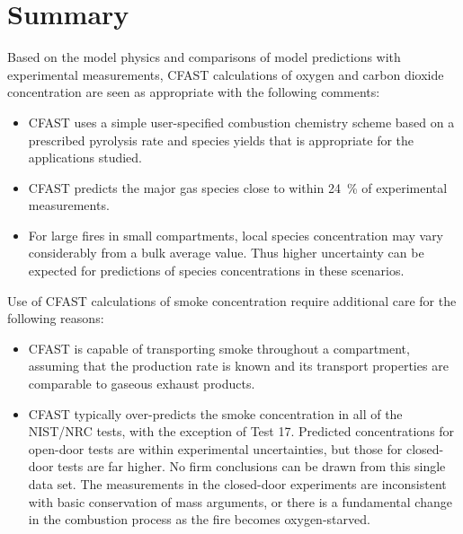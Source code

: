 \section{Summary}

Based on the model physics and comparisons of model predictions with experimental measurements, CFAST calculations of oxygen and carbon dioxide concentration are seen as appropriate with the following comments:

\begin{itemize}
\item CFAST uses a simple user-specified combustion chemistry scheme based on a prescribed pyrolysis rate and species yields that is appropriate for the applications studied.
\item CFAST predicts the major gas species close to within 24~\% of experimental measurements.
\item For large fires in small compartments, local species concentration may vary considerably from a bulk average value.  Thus higher uncertainty can be expected for predictions of species concentrations in these scenarios.
\end{itemize}

Use of CFAST calculations of smoke concentration require additional care for the following reasons:

\begin{itemize}
\item CFAST is capable of transporting smoke throughout a compartment, assuming that the production rate is known and its transport properties are comparable to gaseous exhaust products.
\item CFAST typically over-predicts the smoke concentration in all of the NIST/NRC tests, with the exception of Test 17.  Predicted concentrations for open-door tests are within experimental uncertainties, but those for closed-door tests are far higher.  No firm conclusions can be drawn from this single data set.  The measurements in the closed-door experiments are inconsistent with basic conservation of mass arguments, or there is a fundamental change in the combustion process as the fire becomes oxygen-starved.
\end{itemize}